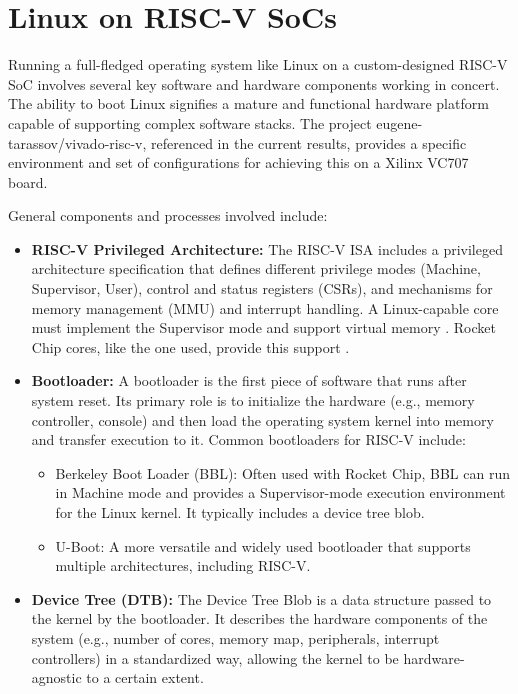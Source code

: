 \section{Linux on RISC-V SoCs}
\label{sec:linux_on_riscv}

Running a full-fledged operating system like Linux on a custom-designed RISC-V SoC involves several key software and hardware components working in concert. The ability to boot Linux signifies a mature and functional hardware platform capable of supporting complex software stacks. The project eugene-tarassov/vivado-risc-v, referenced in the current results, provides a specific environment and set of configurations for achieving this on a Xilinx VC707 board.

General components and processes involved include:
\begin{itemize}
    \item \textbf{RISC-V Privileged Architecture:} The RISC-V ISA includes a privileged architecture specification that defines different privilege modes (Machine, Supervisor, User), control and status registers (CSRs), and mechanisms for memory management (MMU) and interrupt handling. A Linux-capable core must implement the Supervisor mode and support virtual memory \cite{waterman2015riscvpriv}. Rocket Chip cores, like the one used, provide this support \cite{asanovic2016rocketchip}.

    \item \textbf{Bootloader:} A bootloader is the first piece of software that runs after system reset. Its primary role is to initialize the hardware (e.g., memory controller, console) and then load the operating system kernel into memory and transfer execution to it. Common bootloaders for RISC-V include:
    \begin{itemize}
        \item Berkeley Boot Loader (BBL): Often used with Rocket Chip, BBL can run in Machine mode and provides a Supervisor-mode execution environment for the Linux kernel. It typically includes a device tree blob.

        \item U-Boot: A more versatile and widely used bootloader that supports multiple architectures, including RISC-V.
    \end{itemize}

    \item \textbf{Device Tree (DTB):} The Device Tree Blob is a data structure passed to the kernel by the bootloader. It describes the hardware components of the system (e.g., number of cores, memory map, peripherals, interrupt controllers) in a standardized way, allowing the kernel to be hardware-agnostic to a certain extent.


\end{itemize}
